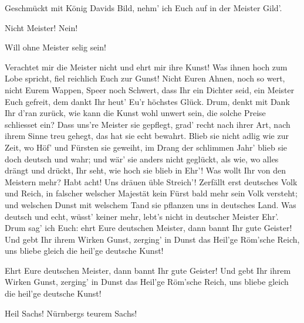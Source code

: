 \begin{drama}
Geschmückt mit König Davids Bild,
nehm' ich Euch auf in der Meister Gild'.

\Waltherspeaks
{}

Nicht Meister! Nein!


Will ohne Meister selig sein!


\Sachsspeaks
{}

Verachtet mir die Meister nicht
und ehrt mir ihre Kunst!
Was ihnen hoch zum Lobe spricht,
fiel reichlich Euch zur Gunst!
Nicht Euren Ahnen, noch so wert,
nicht Eurem Wappen, Speer noch Schwert,
dass Ihr ein Dichter seid,
ein Meister Euch gefreit,
dem dankt Ihr heut' Eu'r höchstes Glück.
Drum, denkt mit Dank Ihr d'ran zurück,
wie kann die Kunst wohl unwert sein,
die solche Preise schliesset ein?
Dass uns're Meister sie gepflegt,
grad' recht nach ihrer Art,
nach ihrem Sinne treu gehegt,
das hat sie echt bewahrt.
Blieb sie nicht adlig wie zur Zeit,
wo Höf' und Fürsten sie geweiht,
im Drang der schlimmen Jahr'
blieb sie doch deutsch und wahr;
und wär' sie anders nicht geglückt,
als wie, wo alles drängt und drückt,
Ihr seht, wie hoch sie blieb in Ehr'!
Was wollt Ihr von den Meistern mehr?
Habt acht! Uns dräuen üble Streich'!
Zerfällt erst deutsches Volk und Reich,
in falscher welscher Majestät
kein Fürst bald mehr sein Volk versteht;
und welschen Dunst mit welschem Tand
sie pflanzen uns in deutsches Land.
Was deutsch und echt, wüsst' keiner mehr,
lebt's nicht in deutscher Meister Ehr'.
Drum sag' ich Euch:
ehrt Eure deutschen Meister,
dann bannt Ihr gute Geister!
Und gebt Ihr ihrem Wirken Gunst,
zerging' in Dunst
das Heil'ge Röm'sche Reich,
uns bliebe gleich
die heil'ge deutsche Kunst!




Ehrt Eure deutschen Meister,
dann bannt Ihr gute Geister!
Und gebt Ihr ihrem Wirken Gunst,
zerging' in Dunst
das Heil'ge Röm'sche Reich,
uns bliebe gleich
die heil'ge deutsche Kunst!



Heil Sachs! Nürnbergs teurem Sachs!

\end{drama}

